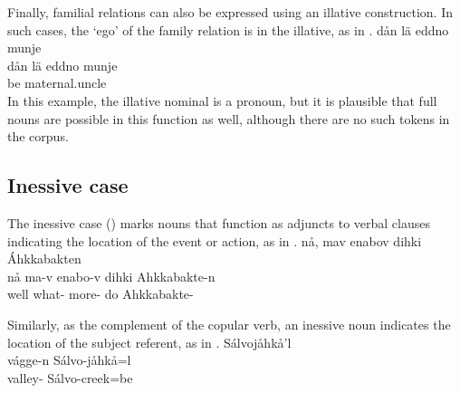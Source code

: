 Finally, familial relations can also be expressed using an illative construction. In such cases, the ‘ego’ of the family relation is in the illative, as in .
\ea\label{ill5}
\glll	dån lä eddno {munje} \\
	dån lä eddno munje\\
	 be\BS{} maternal.uncle\BS{}  \\%
\z
In this example, the illative nominal is a pronoun, but it is plausible that full nouns are possible in this function as well, although there are no such tokens in the corpus.


\subsection{Inessive case}\label{inessive}
The inessive case \mbox{(\INESSs)} marks nouns that function as adjuncts to verbal clauses indicating the location of the event or action, as in . 
\ea\label{iness1}
\glll	nå, mav enabov dihki {Áhkkabakten} \\
	nå ma-v enabo-v dihki Ahkkabakte-n \\
	well what- more- do\BS{} Ahkkabakte- \\\nopagebreak
{} 
\z

Similarly, as the complement of the copular verb, an inessive noun indicates the location of the subject referent, as in .
\ea\label{iness2}
 Sálvojåhkå'l\\
	vágge-n Sálvo-jåhkå=l\\
	valley- Sálvo-creek\BS{}=be\BS{}\\\nopagebreak
{} 
\z


